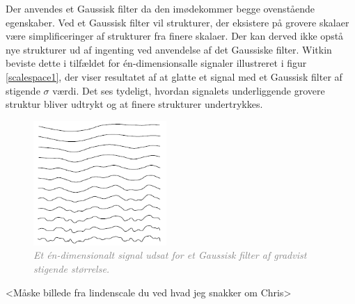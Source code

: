 Der anvendes et Gaussisk filter da den imødekommer begge ovenstående egenskaber. Ved et Gaussisk filter vil strukturer, der eksistere på grovere skalaer være simplificeringer af strukturer fra finere skalaer. Der kan derved ikke opstå nye strukturer ud af ingenting ved anvendelse af det Gaussiske filter. Witkin \cite{witkins} beviste dette i tilfældet for én-dimensionsalle signaler illustreret i figur \ref{scalespace1}, der viser resultatet af at glatte et signal med et Gaussisk filter af stigende $\sigma$ værdi. Det ses tydeligt, hvordan signalets underliggende grovere struktur bliver udtrykt og at finere strukturer undertrykkes.
\begin{figure}[H]
    \centering
    \includegraphics[width=0.45\textwidth]{fig/33.png}
     \vspace{-1em}
    \begin{center}    
       \caption{\textcolor{gray}{\footnotesize \textit{Et én-dimensionalt signal udsat for et Gaussisk filter af gradvist stigende størrelse.}}}
    \label{fig:scalereps}
     \end{center}
     \vspace{-2.5em}
  \end{figure} \noindent
<Måske billede fra lindenscale du ved hvad jeg snakker om Chris>
